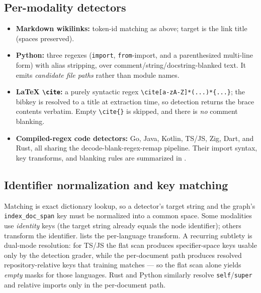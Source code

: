 \subsection{Per-modality detectors}

\begin{itemize}
  \item \textbf{Markdown wikilinks:} token-id matching as above; target is the
        link title (spaces preserved).
  \item \textbf{Python:} three regexes (\texttt{import}, \texttt{from}-import, and a
        parenthesized multi-line form) with alias stripping, over
        comment/string/docstring-blanked text. It emits \emph{candidate file paths}
        rather than module names.
  \item \textbf{LaTeX \texttt{\textbackslash cite}:} a purely syntactic regex
        \texttt{\textbackslash cite[a-zA-Z]*(\lbrack...\rbrack)*\{...\}}; the bibkey is
        resolved to a title at extraction time, so detection returns the brace
        contents verbatim. Empty \texttt{\textbackslash cite\{\}} is skipped, and
        there is \emph{no} comment blanking.
  \item \textbf{Compiled-regex code detectors:} Go, Java, Kotlin, TS/JS, Zig, Dart,
        and Rust, all sharing the decode-blank-regex-remap pipeline. Their import
        syntax, key transforms, and blanking rules are summarized in
        .
\end{itemize}

\subsection{Identifier normalization and key matching}
\label{app:linkdet:norm}

Matching is exact dictionary lookup, so a detector's target string and the graph's
\texttt{index\_doc\_span} key must be normalized into a common space. Some
modalities use \emph{identity} keys (the target string already equals the node
identifier); others transform the identifier.  lists the
per-language transform. A recurring subtlety is dual-mode resolution: for TS/JS the
flat scan produces specifier-space keys usable only by the detection grader, while
the per-document path produces resolved repository-relative keys that training
matches --- so the flat scan alone yields \emph{empty} masks for those languages.
Rust and Python similarly resolve \texttt{self}/\texttt{super} and relative imports
only in the per-document path.

